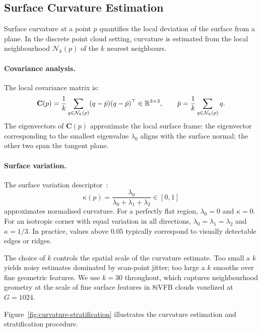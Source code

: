 \subsection{Surface Curvature Estimation}
\label{ssec:curvature-theory}

Surface curvature at a point $p$ quantifies the local deviation of the surface
from a plane.
In the discrete point cloud setting, curvature is estimated from the local
neighbourhood $\mathcal{N}_k(p)$ of the $k$ nearest neighbours.

\paragraph{Covariance analysis.}
The local covariance matrix is:
\begin{equation}
  \mathbf{C}(p) = \frac{1}{k}\sum_{q \in \mathcal{N}_k(p)}
    (q - \bar{p})(q - \bar{p})^\top \in \mathbb{R}^{3\times3},
  \qquad \bar{p} = \frac{1}{k}\sum_{q \in \mathcal{N}_k(p)} q.
\end{equation}
The eigenvectors of $\mathbf{C}(p)$ approximate the local surface frame:
the eigenvector corresponding to the smallest eigenvalue $\lambda_0$ aligns
with the surface normal; the other two span the tangent plane.

\paragraph{Surface variation.}
The surface variation descriptor~\cite{pauly2002efficient}:
\begin{equation}
  \kappa(p) = \frac{\lambda_0}{\lambda_0 + \lambda_1 + \lambda_2} \in [0, 1]
\end{equation}
approximates normalised curvature.
For a perfectly flat region, $\lambda_0 = 0$ and $\kappa = 0$.
For an isotropic corner with equal variation in all directions,
$\lambda_0 = \lambda_1 = \lambda_2$ and $\kappa = 1/3$.
In practice, values above $0.05$ typically correspond to visually detectable
edges or ridges.

The choice of $k$ controls the spatial scale of the curvature estimate.
Too small a $k$ yields noisy estimates dominated by scan-point jitter;
too large a $k$ smooths over fine geometric features.
We use $k = 30$ throughout, which captures neighbourhood geometry at the
scale of fine surface features in 8iVFB clouds voxelized at $G = 1024$.

Figure~\ref{fig:curvature-stratification} illustrates the curvature estimation
and stratification procedure.

